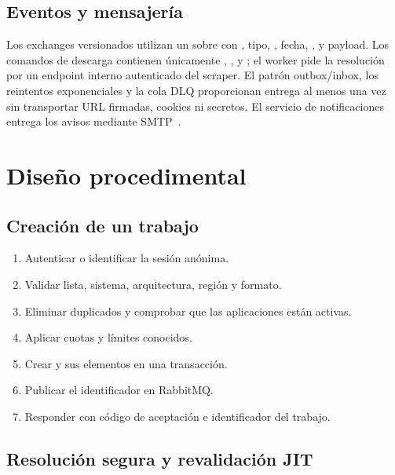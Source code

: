 \subsection{Eventos y mensajería}

Los exchanges versionados utilizan un sobre con , tipo, , fecha, ,  y payload. Los comandos de descarga contienen únicamente , ,  y ; el worker pide la resolución por un endpoint interno autenticado del scraper. El patrón outbox/inbox, los reintentos exponenciales y la cola DLQ proporcionan entrega al menos una vez sin transportar URL firmadas, cookies ni secretos. El servicio de notificaciones entrega los avisos mediante SMTP~\cite{smtp}.


\section{Diseño procedimental}

\subsection{Creación de un trabajo}

\begin{enumerate}
	\item Autenticar o identificar la sesión anónima.
	\item Validar lista, sistema, arquitectura, región y formato.
	\item Eliminar duplicados y comprobar que las aplicaciones están activas.
	\item Aplicar cuotas y límites conocidos.
	\item Crear  y sus elementos en una transacción.
	\item Publicar el identificador en RabbitMQ.
	\item Responder con código de aceptación e identificador del trabajo.
\end{enumerate}

\subsection{Resolución segura y revalidación JIT}

